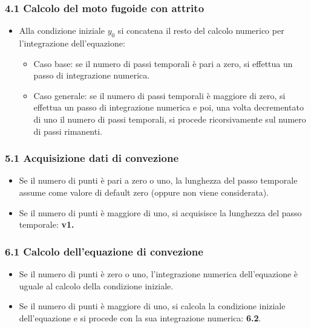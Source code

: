 \subsubsection*{4.1 Calcolo del moto fugoide con attrito}
\begin{itemize}
\item Alla condizione iniziale $y_0$ si concatena il resto del calcolo numerico per l'integrazione dell'equazione:
\begin{itemize}
\item Caso base: se il numero di passi temporali è pari a zero, si effettua un passo di integrazione numerica.
\item Caso generale: se il numero di passi temporali è maggiore di zero, si effettua un passo di integrazione numerica e poi, una volta decrementato di uno il numero di passi temporali, si procede ricorsivamente sul numero di passi rimanenti. 
\end{itemize}
\end{itemize}

\subsubsection*{5.1 Acquisizione dati di convezione}
\begin{itemize}
\item Se il numero di punti è pari a zero o uno, la lunghezza del passo temporale assume come valore di default zero (oppure non viene considerata).
\item Se il numero di punti è maggiore di uno, si acquisisce la lunghezza del passo temporale: \textbf{v1.}
\end{itemize}

\subsubsection*{6.1 Calcolo dell'equazione di convezione}
\begin{itemize}
\item Se il numero di punti è zero o uno, l'integrazione numerica dell'equazione è uguale al calcolo della condizione iniziale.
\item Se il numero di punti è maggiore di uno, si calcola la condizione iniziale dell'equazione e si procede con la sua integrazione numerica: \textbf{6.2}.
\end{itemize}

